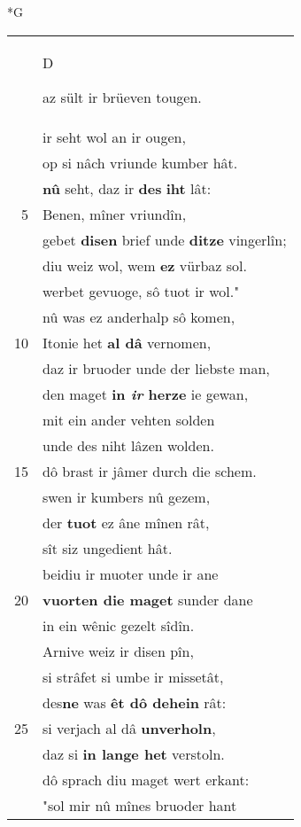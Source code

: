\documentclass[8pt,a4paper,notitlepage]{article}
\begin{document}
\begin{table}[ht]
\begin{minipage}[t]{0.5\linewidth}
\small
\begin{center}*G
\end{center}
\begin{tabular}{rl}
 & \begin{large}D\end{large}az sült ir brüeven tougen.\\ 
 & ir seht wol an ir ougen,\\ 
 & op si nâch vriunde kumber hât.\\ 
 & \textbf{nû} seht, daz ir \textbf{des} \textbf{iht} lât:\\ 
5 & Benen, mîner vriundîn,\\ 
 & gebet \textbf{disen} brief unde \textbf{ditze} vingerlîn;\\ 
 & diu weiz wol, wem \textbf{ez} vürbaz sol.\\ 
 & werbet gevuoge, sô tuot ir wol."\\ 
 & nû was ez anderhalp sô komen,\\ 
10 & Itonie het \textbf{al dâ} vernomen,\\ 
 & daz ir bruoder unde der liebste man,\\ 
 & den maget \textbf{in \textit{ir} herze} ie gewan,\\ 
 & mit ein ander vehten solden\\ 
 & unde des niht lâzen wolden.\\ 
15 & dô brast ir jâmer durch die schem.\\ 
 & swen ir kumbers nû gezem,\\ 
 & der \textbf{tuot} ez âne mînen rât,\\ 
 & sît siz ungedient hât.\\ 
 & beidiu ir muoter unde ir ane\\ 
20 & \textbf{vuorten die maget} sunder dane\\ 
 & in ein wênic gezelt sîdîn.\\ 
 & Arnive weiz ir disen pîn,\\ 
 & si strâfet si umbe ir missetât,\\ 
 & des\textbf{ne} was \textbf{êt dô dehein} rât:\\ 
25 & si verjach al dâ \textbf{unverholn},\\ 
 & daz si \textbf{in lange het} verstoln.\\ 
 & dô sprach diu maget wert erkant:\\ 
 & "sol mir nû mînes bruoder hant\\ 

\end{tabular}
\end{minipage}
\end{table}
\end{document}
